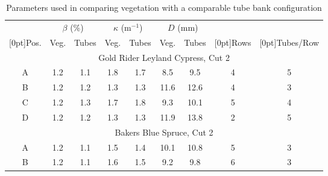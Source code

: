 \documentclass[12pt]{article}
\begin{document}
\begin{table}[!]
    \centering
    \caption{Parameters used in comparing vegetation with a comparable tube bank configuration}
    \label{tab:tube_parameters}
    \begin{tabular}{|c|c|c|c|c|c|c|c|c|}
    \hline
                                 & \multicolumn{2}{|c|}{$\beta$ (\%)} & \multicolumn{2}{|c|}{$\kappa$ (m$^{-1}$)} & \multicolumn{2}{|c|}{$D$ (mm)} &                             &                                  \\ \cline{2-7}
    \raisebox{1.5ex}[0pt]{Pos.}  & Veg.             & Tubes      & Veg.                 & Tubes              & Veg.              & Tubes      & \raisebox{1.5ex}[0pt]{Rows} & \raisebox{1.5ex}[0pt]{Tubes/Row} \\ \hline \hline
    \multicolumn{9}{|c|}{Gold Rider Leyland Cypress, Cut 2}                                                                                                                                                    \\ \hline
    A                            & 1.2            & 1.1      & 1.8                  & 1.7                & 8.5               & 9.5        & 4                           & 5                                \\ \hline
    B                            & 1.2            &1.2      & 1.3                  & 1.3                & 11.6              & 12.6       & 4                           & 3                                \\ \hline
    C                            & 1.2            & 1.3      & 1.7                  & 1.8                & 9.3               & 10.1       & 5                           & 4                                \\ \hline
    D                            & 1.2           & 1.2      & 1.3                  & 1.3                & 11.9              & 13.8       & 2                           & 5                                \\ \hline
        \multicolumn{9}{|c|}{Bakers Blue Spruce, Cut 2}                                                                                                                                                    \\ \hline
    A                            &1.2           & 1.1      & 1.5                  & 1.4                & 10.1              & 10.8       & 5                           & 3                                \\ \hline
    B                            & 1.2          & 1.1      & 1.6                  & 1.5                & 9.2               & 9.8        & 6                           & 3                                \\ \hline

\end{tabular}
\end{table}
\end{document}
